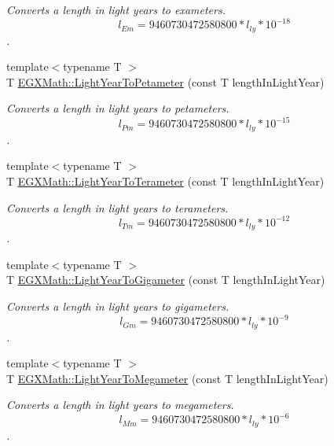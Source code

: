 \begin{DoxyCompactItemize}
\begin{DoxyCompactList}\small\item\em Converts a length in light years to exameters. \[ l_{Em}=9460730472580800 * l_{ly} * 10^{-18} \]. \end{DoxyCompactList}\item 
{\footnotesize template$<$typename T $>$ }\\T \mbox{\hyperlink{group___e_g_x_math-_conversions-_length_conversions-_astronomical-_light_year-_s_i_ga23dfd2716086a8359b2231a3fad972e6}{E\+G\+X\+Math\+::\+Light\+Year\+To\+Petameter}} (const T length\+In\+Light\+Year)
\begin{DoxyCompactList}\small\item\em Converts a length in light years to petameters. \[ l_{Pm}=9460730472580800 * l_{ly} * 10^{-15} \]. \end{DoxyCompactList}\item 
{\footnotesize template$<$typename T $>$ }\\T \mbox{\hyperlink{group___e_g_x_math-_conversions-_length_conversions-_astronomical-_light_year-_s_i_ga0813df48068b4379915d32afbb142d28}{E\+G\+X\+Math\+::\+Light\+Year\+To\+Terameter}} (const T length\+In\+Light\+Year)
\begin{DoxyCompactList}\small\item\em Converts a length in light years to terameters. \[ l_{Tm}=9460730472580800 * l_{ly} * 10^{-12} \]. \end{DoxyCompactList}\item 
{\footnotesize template$<$typename T $>$ }\\T \mbox{\hyperlink{group___e_g_x_math-_conversions-_length_conversions-_astronomical-_light_year-_s_i_ga66a1da0c523d43d8e60c911e92703e97}{E\+G\+X\+Math\+::\+Light\+Year\+To\+Gigameter}} (const T length\+In\+Light\+Year)
\begin{DoxyCompactList}\small\item\em Converts a length in light years to gigameters. \[ l_{Gm}=9460730472580800 * l_{ly} * 10^{-9} \]. \end{DoxyCompactList}\item 
{\footnotesize template$<$typename T $>$ }\\T \mbox{\hyperlink{group___e_g_x_math-_conversions-_length_conversions-_astronomical-_light_year-_s_i_ga55603d7948429b49c2942b228c1376ed}{E\+G\+X\+Math\+::\+Light\+Year\+To\+Megameter}} (const T length\+In\+Light\+Year)
\begin{DoxyCompactList}\small\item\em Converts a length in light years to megameters. \[ l_{Mm}=9460730472580800 * l_{ly} * 10^{-6} \]. \end{DoxyCompactList}\item 

\end{DoxyCompactItemize}

